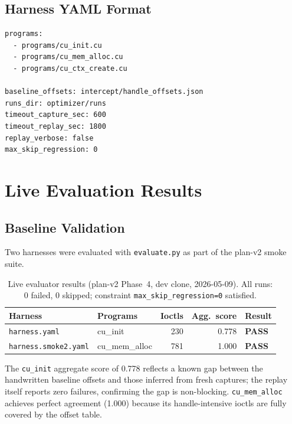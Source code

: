 \documentclass[11pt,a4paper]{article}
\begin{document}
\subsection{Harness YAML Format}

\begin{lstlisting}[style=shell, caption={Harness YAML (\texttt{harness.gepa\_seed.yaml}).}]
programs:
  - programs/cu_init.cu
  - programs/cu_mem_alloc.cu
  - programs/cu_ctx_create.cu

baseline_offsets: intercept/handle_offsets.json
runs_dir: optimizer/runs
timeout_capture_sec: 600
timeout_replay_sec: 1800
replay_verbose: false
max_skip_regression: 0
\end{lstlisting}

\section{Live Evaluation Results}
\label{sec:live}

\subsection{Baseline Validation}

Two harnesses were evaluated with \texttt{evaluate.py} as part of the plan-v2
smoke suite.

\begin{table}[H]
\centering
\caption{Live evaluator results (plan-v2 Phase~4, dev clone, 2026-05-09).
         All runs: 0 failed, 0 skipped; constraint \texttt{max\_skip\_regression=0}
         satisfied.}
\label{tab:live}
\begin{tabular}{llrrl}
\toprule
\textbf{Harness} & \textbf{Programs} & \textbf{Ioctls} & \textbf{Agg.\ score} & \textbf{Result} \\
\midrule
\texttt{harness.yaml}       & cu\_init             & 230 & 0.778 & \textbf{PASS} \\
\texttt{harness.smoke2.yaml}& cu\_mem\_alloc       & 781 & 1.000 & \textbf{PASS} \\
\bottomrule
\end{tabular}
\end{table}

The \texttt{cu\_init} aggregate score of 0.778 reflects a known gap between
the handwritten baseline offsets and those inferred from fresh captures; the
replay itself reports zero failures, confirming the gap is non-blocking.
\texttt{cu\_mem\_alloc} achieves perfect agreement (1.000) because its
handle-intensive ioctls are fully covered by the offset table.
\end{document}
